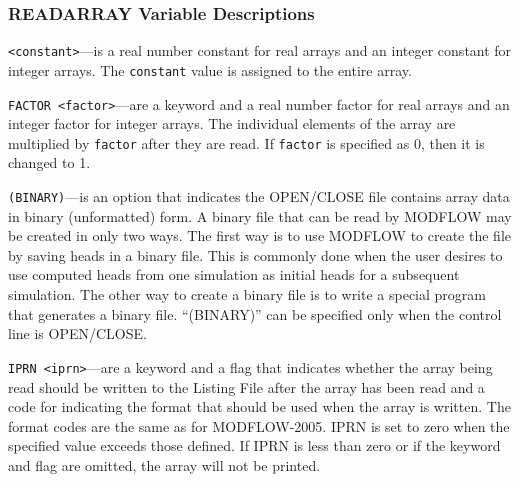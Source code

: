 \subsubsection{READARRAY Variable Descriptions}

\begin{description}

\item \texttt{<constant>}---is a real number constant for real arrays and an integer constant for integer arrays. The \texttt{constant} value is assigned to the entire array. 

\item \texttt{FACTOR <factor>}---are a keyword and a real number factor for real arrays and an integer factor for integer arrays. The individual elements of the array are multiplied by \texttt{factor} after they are read. If \texttt{factor} is specified as 0, then it is changed to 1.

\item \texttt{(BINARY)}---is an option that indicates the OPEN/CLOSE file contains array data in binary (unformatted) form. A binary file that can be read by MODFLOW may be created in only two ways. The first way is to use MODFLOW to create the file by saving heads in a binary file. This is commonly done when the user desires to use computed heads from one simulation as initial heads for a subsequent simulation. The other way to create a binary file is to write a special program that generates a binary file.  ``(BINARY)'' can be specified only when the control line is OPEN/CLOSE.

\item \texttt{IPRN <iprn>}---are a keyword and a flag that indicates whether the array being read should be written to the Listing File after the array has been read and a code for indicating the format that should be used when the array is written. The format codes are the same as for MODFLOW-2005. IPRN is set to zero when the specified value exceeds those defined. If IPRN is less than zero or if the keyword and flag are omitted, the array will not be printed.

\end{description}

